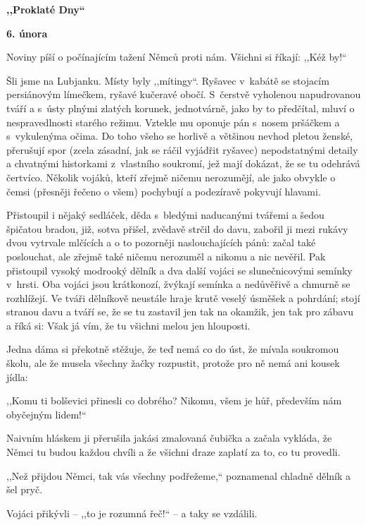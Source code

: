 \bigskip

\noindent
\textbf{,,Proklaté Dny``}

\medskip

\noindent
\textbf{6. února} 	

\noindent
Noviny píší o počínajícím tažení Němců proti nám. Všichni si říkají: ,,Kéž by!``

Šli jsme na Lubjanku. Místy byly ,,mítingy``. Ryšavec v kabátě se stojacím persiánovým límečkem, ryšavé kučeravé obočí. S čerstvě vyholenou napudrovanou tváří a s ústy plnými zlatých korunek, jednotvárně, jako by to předčítal, mluví o nespravedlnosti starého režimu. Vztekle mu oponuje pán s nosem pršáčkem a s vykulenýma očima. Do toho všeho se horlivě a většinou  nevhod pletou ženské, přerušují spor (zcela zásadní, jak se ráčil vyjádřit ryšavec) nepodstatnými detaily a chvatnými historkami z vlastního soukromí, jež mají dokázat, že se tu odehrává čertvíco. Několik vojáků, kteří zřejmě ničemu nerozumějí, ale jako obvykle o čemsi (přesněji řečeno o všem) pochybují a podezíravě pokyvují hlavami.

Přistoupil i nějaký sedláček, děda s bledými naducanými tváře\-mi a šedou špičatou bradou, již, sotva přišel, zvědavě strčil do davu, zabořil ji mezi rukávy dvou vytrvale mlčících a o to pozorněji naslouchajících pánů: začal také poslouchat, ale zřejmě také ničemu nerozuměl a nikomu a nic nevěřil. Pak přistoupil vysoký modrooký dělník a dva další vojáci se slunečnicovými semínky v hrsti. Oba vojáci jsou krátkonozí, žvýkají semínka a nedůvěřivě a chmurně se rozhlížejí. Ve tváři dělníkově neustále hraje krutě veselý úsměšek a pohrdání; stojí stranou davu a tváří se, že se tu zastavil jen tak na okamžik, jen tak pro zábavu a říká si: Však já vím, že tu všichni melou jen hlouposti.

Jedna dáma si překotně stěžuje, že teď nemá co do úst, že mívala soukromou školu, ale že musela všechny žačky rozpustit, protože pro ně nemá ani kousek jídla:

,,Komu ti bolševici přinesli co dobrého? Nikomu, všem je hůř, především nám obyčejným lidem!``

Naivním hláskem ji přerušila jakási zmalovaná čubička a začala vykláda, že Němci tu budou každou chvíli a že všichni draze zaplatí za to, co tu provedli.

,,Než přijdou Němci, tak vás všechny podřežeme,`` poznamenal chladně dělník a šel pryč.

Vojáci přikývli -- ,,to je rozumná řeč!`` -- a taky se vzdálili.

